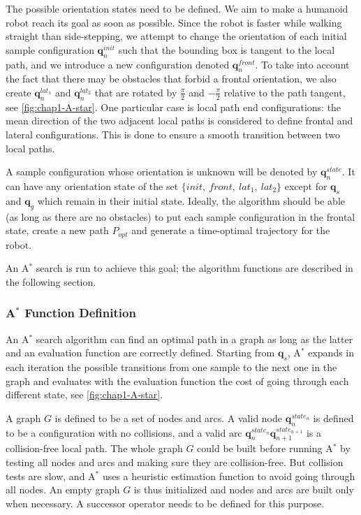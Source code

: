 The possible orientation states need to be defined. We aim to make a
humanoid robot reach its goal as soon as possible. Since the robot is
faster while walking straight than side-stepping, we attempt to change
the orientation of each initial sample configuration
$\mathbf{q}_n^{init}$ such that the bounding box is tangent to the
local path, and we introduce a new configuration denoted
$\mathbf{q}_n^{front}$. To take into account the fact that there may
be obstacles that forbid a frontal orientation, we also create
$\mathbf{q}_n^{lat_1}$ and $\mathbf{q}_n^{lat_2}$ that are rotated by
$\frac{\pi}{2}$ and $-\frac{\pi}{2}$ relative to the path tangent, see
\autoref{fig:chap1-A-star}. One particular case is local path end
configurations: the mean direction of the two adjacent local paths is
considered to define frontal and lateral configurations. This is done
to ensure a smooth transition between two local paths.

A sample configuration whose orientation is unknown will be denoted by
$\mathbf{q}_n^{state}$. It can have any orientation state of the set
$\{init,~front,~lat_1,~lat_2\}$ except for $\mathbf{q}_s$ and
$\mathbf{q}_g$ which remain in their initial state.  Ideally, the
algorithm should be able (as long as there are no obstacles) to put
each sample configuration in the frontal state, create a new path
$P_{opt}$ and generate a time-optimal trajectory for the robot.

An A$^{*}$ search is run to achieve this goal; the algorithm functions are
described in the following section.

\subsubsection{A$^{*}$ Function Definition}
\label{sec:chap1-A-star}
An A$^{*}$ search algorithm can find an optimal path in a graph as
long as the latter and an evaluation function are correctly
defined. Starting from $\mathbf{q}_s$, A$^{*}$ expands in each
iteration the possible transitions from one sample to the next one in
the graph and evaluates with the evaluation function the cost of going
through each different state, see \autoref{fig:chap1-A-star}.

A graph $G$ is defined to be a set of nodes and arcs. A valid node
$\mathbf{q}_n^{state_n}$ is defined to be a configuration with no
collisions, and a valid arc
$\mathbf{q}_n^{state_n}\mathbf{q}_{n+1}^{state_{n+1}}$ is a
collision-free local path. The whole graph $G$ could be built before
running A$^{*}$ by testing all nodes and arcs and making sure they are
collision-free. But collision tests are slow, and A$^{*}$ uses a
heuristic estimation function to avoid going through all nodes. An
empty graph $G$ is thus initialized and nodes and arcs are built only
when necessary. A successor operator needs to be defined for this
purpose.

